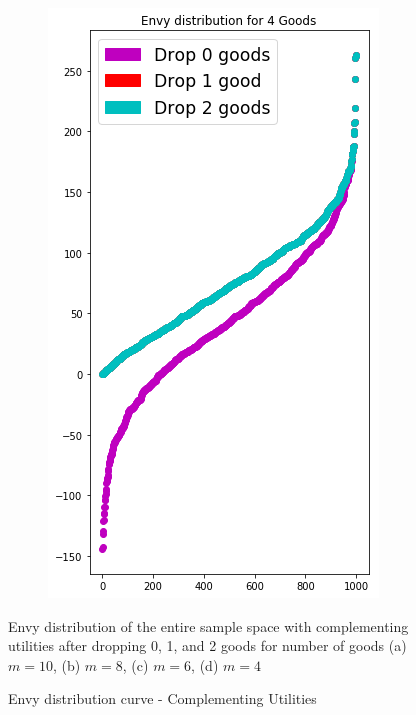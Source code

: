 \begin{figure}[h!]
\begin{subfigure}[b]{0.47\linewidth}
    \includegraphics[width=\linewidth]{images/envy_density/envy_density_uv4.png}
    \caption{}
  \end{subfigure}
  \caption{Envy distribution curve - Complementing Utilities}
  \label{fig_efk_dist_curve_compl}
  \small
    Envy distribution of the entire sample space with complementing utilities after dropping 0, 1, and 2 goods for number of goods (a) $m = 10$, (b) $m = 8$, (c) $m = 6$, (d) $m = 4$
\end{figure}

